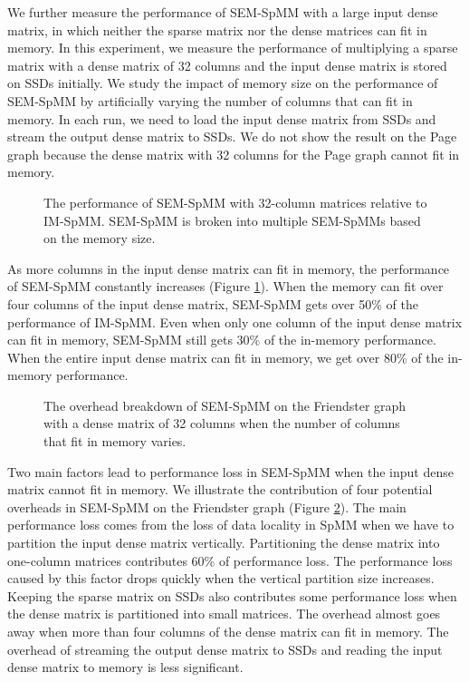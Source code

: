 We further measure the performance of SEM-SpMM with a large input dense matrix,
in which neither the sparse matrix nor the dense matrices can fit in memory.
In this experiment, we measure the performance of
multiplying a sparse matrix with a dense matrix of 32 columns and the input
dense matrix is stored on SSDs initially. We study the impact of memory size
on the performance of SEM-SpMM by artificially varying the number of columns
that can fit in memory. In each run, we need to load the input dense matrix from
SSDs and stream the output dense matrix to SSDs. We do not show the result on
the Page graph because the dense matrix with 32 columns for the Page graph
cannot fit in memory.

\begin{figure}
	\begin{center}
		\footnotesize
		
		\caption{The performance of SEM-SpMM with 32-column matrices
			relative to IM-SpMM. SEM-SpMM is broken into multiple SEM-SpMMs
		based on the memory size.}
		\label{perf:spmm32}
	\end{center}
\end{figure}

As more columns in the input dense matrix can fit in memory, the performance
of SEM-SpMM constantly increases (Figure \ref{perf:spmm32}). When the memory
can fit over four columns of the input dense matrix, SEM-SpMM gets over 50\%
of the performance of IM-SpMM. Even when only one column of the input dense
matrix can fit in memory, SEM-SpMM still gets 30\% of the in-memory
performance. When the entire input dense matrix can fit in memory, we get over
80\% of the in-memory performance.

\begin{figure}
	\begin{center}
		\footnotesize
		
		\caption{The overhead breakdown of SEM-SpMM on the Friendster
			graph with a dense matrix of 32 columns when the number
			of columns that fit in memory varies. }
		\label{perf:spmm32_over}
	\end{center}
\end{figure}

Two main factors lead to performance loss in SEM-SpMM when the input dense matrix
cannot fit in memory. We illustrate the contribution of four potential overheads
in SEM-SpMM on the Friendster graph (Figure \ref{perf:spmm32_over}). The main
performance loss comes from the loss of data locality in SpMM when we have to
partition the input dense matrix vertically.
Partitioning the dense matrix into one-column matrices contributes 60\%
of performance loss. The performance loss caused by this factor drops quickly
when the vertical partition size increases. Keeping the sparse matrix on SSDs
also contributes some performance loss when the dense matrix is partitioned
into small matrices. The overhead almost goes away when more than four columns
of the dense matrix can fit in memory. The overhead of streaming the output dense
matrix to SSDs and reading the input dense matrix to memory is less significant.

